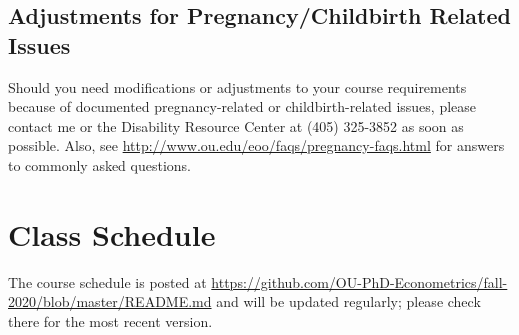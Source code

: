 \documentclass[11pt,english]{article}
\begin{document}
\subsection*{Adjustments for Pregnancy/Childbirth Related Issues}

Should you need modifications or adjustments to your course requirements because of documented pregnancy-related or childbirth-related issues, please contact me or the Disability Resource Center at (405) 325-3852 as soon as possible. Also, see \url{http://www.ou.edu/eoo/faqs/pregnancy-faqs.html} for answers to commonly asked questions.

\section*{Class Schedule}
The course schedule is posted at \url{https://github.com/OU-PhD-Econometrics/fall-2020/blob/master/README.md} and will be updated regularly; please check there for the most recent version.
\end{document}
